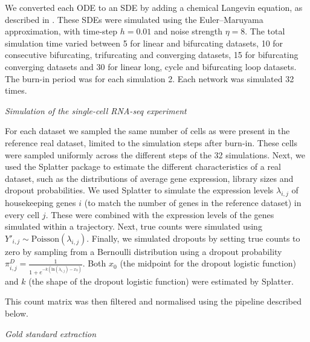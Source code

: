 We converted each ODE to an SDE by adding a chemical Langevin equation, as described in \cite{schaffter_genenetweaversilicobenchmark_2011}. These SDEs were simulated using the Euler–Maruyama approximation, with time-step $h = 0.01$ and noise strength $\eta = 8$. The total simulation time varied between 5 for linear and bifurcating datasets, 10 for consecutive bifurcating, trifurcating and converging datasets, 15 for bifurcating converging datasets and 30 for linear long, cycle and bifurcating loop datasets. The burn-in period was for each simulation 2. Each network was simulated 32 times.

\hfill\break
\textit{Simulation of the single-cell RNA-seq experiment}
\hfill\break

For each dataset we sampled the same number of cells as were present in the reference real dataset, limited to the simulation steps after burn-in. These cells were sampled uniformly across the different steps of the 32 simulations.  Next, we used the Splatter package \cite{zappia_splattersimulationsinglecell_2017} to estimate the different characteristics of a real dataset, such as the distributions of average gene expression, library sizes and dropout probabilities. We used Splatter to simulate the expression levels $\lambda_{i,j}$ of housekeeping genes $i$ (to match the number of genes in the reference dataset) in every cell $j$. These were combined with the expression levels of the genes simulated within a trajectory. Next, true counts were simulated using $Y'_{i,j} \sim \text{Poisson}(\lambda_{i,j})$. Finally, we simulated dropouts by setting true counts to zero by sampling from a Bernoulli distribution using a dropout probability $\pi^D_{i,j} =\frac{1}{1+e^{-k(\text{ln}(\lambda_{i,j})-x_0)}}$. Both $x_0$ (the midpoint for the dropout logistic function) and $k$ (the shape of the dropout logistic function) were estimated by Splatter.

This count matrix was then filtered and normalised using the pipeline described below.

\hfill\break
\textit{Gold standard extraction}
\hfill\break

